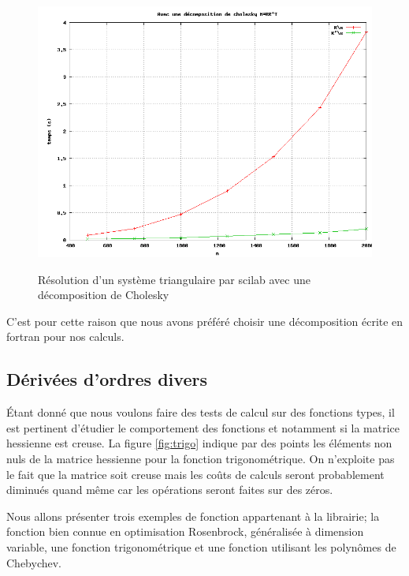 \begin{figure}
\caption{R\'esolution d'un syst\`eme triangulaire par scilab avec une d\'ecomposition de Cholesky}
\center
\includegraphics[scale=0.39]{figures/chol.png}
\label{fig:chol}
\end{figure}

C'est pour cette raison que nous avons pr\'ef\'er\'e choisir une d\'ecomposition \'ecrite en fortran pour nos calculs.


    \subsection{D\'eriv\'ees d'ordres divers}

% 
% 
% 
\'Etant donn\'e que nous voulons faire des tests de calcul sur des fonctions types, il est pertinent
d'\'etudier le comportement des fonctions et notamment si la matrice hessienne est creuse.
La figure \ref{fig:trigo} indique par des points les \'el\'ements non nuls de la matrice hessienne
pour la fonction trigonom\'etrique.
On n'exploite pas le fait que la matrice soit creuse mais les coûts de calculs seront probablement
diminu\'es quand même car les op\'erations seront faites sur des z\'eros.



% 
Nous allons pr\'esenter trois exemples de fonction appartenant \`a la librairie; la fonction bien connue en optimisation Rosenbrock, g\'en\'eralis\'ee \`a dimension variable, 
une fonction trigonom\'etrique et une fonction utilisant les polynômes de Chebychev.
% 
% 
% 



